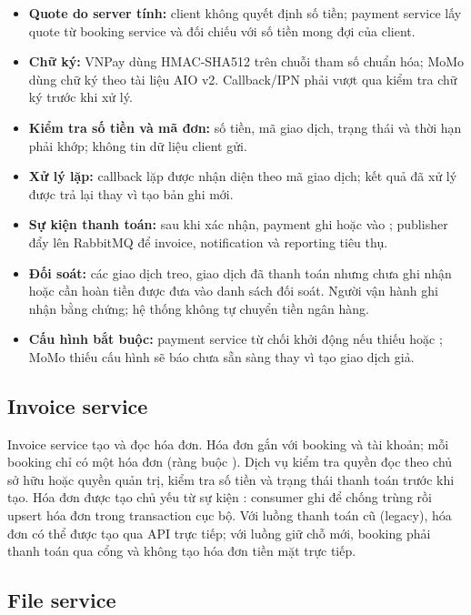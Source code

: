 \begin{itemize}
  \item \textbf{Quote do server tính:} client không quyết định số tiền; payment service lấy quote từ booking service và đối chiếu với số tiền mong đợi của client.
  \item \textbf{Chữ ký:} VNPay dùng HMAC-SHA512 trên chuỗi tham số chuẩn hóa; MoMo dùng chữ ký theo tài liệu AIO v2. Callback/IPN phải vượt qua kiểm tra chữ ký trước khi xử lý.
  \item \textbf{Kiểm tra số tiền và mã đơn:} số tiền, mã giao dịch, trạng thái và thời hạn phải khớp; không tin dữ liệu client gửi.
  \item \textbf{Xử lý lặp:} callback lặp được nhận diện theo mã giao dịch; kết quả đã xử lý được trả lại thay vì tạo bản ghi mới.
  \item \textbf{Sự kiện thanh toán:} sau khi xác nhận, payment ghi  hoặc  vào ; publisher đẩy lên RabbitMQ để invoice, notification và reporting tiêu thụ.
  \item \textbf{Đối soát:} các giao dịch treo, giao dịch đã thanh toán nhưng chưa ghi nhận hoặc cần hoàn tiền được đưa vào danh sách đối soát. Người vận hành ghi nhận bằng chứng; hệ thống không tự chuyển tiền ngân hàng.
  \item \textbf{Cấu hình bắt buộc:} payment service từ chối khởi động nếu thiếu  hoặc ; MoMo thiếu cấu hình sẽ báo chưa sẵn sàng thay vì tạo giao dịch giả.
\end{itemize}

\subsection{Invoice service}
\label{subsec:invoice-service}

Invoice service tạo và đọc hóa đơn. Hóa đơn gắn với booking và tài khoản; mỗi booking chỉ có một hóa đơn (ràng buộc ). Dịch vụ kiểm tra quyền đọc theo chủ sở hữu hoặc quyền quản trị, kiểm tra số tiền và trạng thái thanh toán trước khi tạo. Hóa đơn được tạo chủ yếu từ sự kiện : consumer ghi  để chống trùng rồi upsert hóa đơn trong transaction cục bộ. Với luồng thanh toán cũ (legacy), hóa đơn có thể được tạo qua API trực tiếp; với luồng giữ chỗ mới, booking phải thanh toán qua cổng và không tạo hóa đơn tiền mặt trực tiếp.

\subsection{File service}
\label{subsec:file-service}

